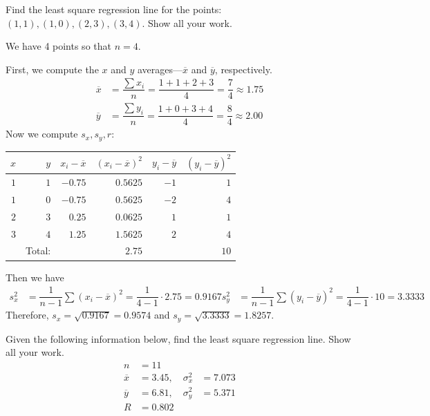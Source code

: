 \documentclass[11pt,letterpaper]{article}
\begin{document}

 Find the least square regression line for the points: $(1, 1), (1,0), (2,3), (3,4)$. Show all your work. \pspace

\sol We have 4 points so that $n= 4$. 

First, we compute the $x$ and $y$ averages---$\overline{x}$ and $\overline{y}$, respectively. 
	\[
	\begin{aligned}
	\overline{x}&= \dfrac{\sum x_i}{n}= \dfrac{1 + 1 + 2 + 3}{4}= \dfrac{7}{4} \approx 1.75 \\
	\overline{y}&= \dfrac{\sum y_i}{n}= \dfrac{1 + 0 + 3 + 4}{4}= \dfrac{8}{4} \approx 2.00 
	\end{aligned}
	\]
Now we compute $s_x, s_y, r$:
	\begin{table}[!ht]
	\centering
	\begin{tabular}{rrrrrr}
	$x$ & $y$ & $x_i - \overline{x}$ & $(x_i - \overline{x})^2$ & $y_i - \overline{y}$ & $(y_i - \overline{y})^2$ \\ \hline
	$1$ & $1$ & $-0.75$ & $0.5625$ & $-1$ & $1$ \\ 
	$1$ & $0$ & $-0.75$ & $0.5625$ & $-2$ & $4$ \\
	$2$ & $3$ & $0.25$ & $0.0625$ & $1$ & $1$ \\
	$3$ & $4$ & $1.25$ & $1.5625$ & $2$ & $4$ \\ \hline
	& Total: & & $2.75$ & & $10$ 
	\end{tabular}
	\end{table}
Then we have
	\[
	\begin{aligned}
	s_x^2&= \dfrac{1}{n - 1} \sum (x_i - \overline{x})^2= \dfrac{1}{4 - 1} \cdot 2.75= 0.9167
	s_y^2&= \dfrac{1}{n - 1} \sum (y_i - \overline{y})^2= \dfrac{1}{4 - 1} \cdot 10= 3.3333
	\end{aligned}
	\]
Therefore, $s_x= \sqrt{0.9167}= 0.9574$ and $s_y= \sqrt{3.3333}= 1.8257$. 


\newpage





 Given the following information below, find the least square regression line. Show all your work. 
	\[
	\begin{aligned}
	n&= 11 \\
	\overline{x}&= 3.45, \quad \sigma_x^2&= 7.073 \\
	\overline{y}&= 6.81, \quad \sigma_y^2&= 5.371 \\
	R&= 0.802
	\end{aligned}
	\]
\end{document}
